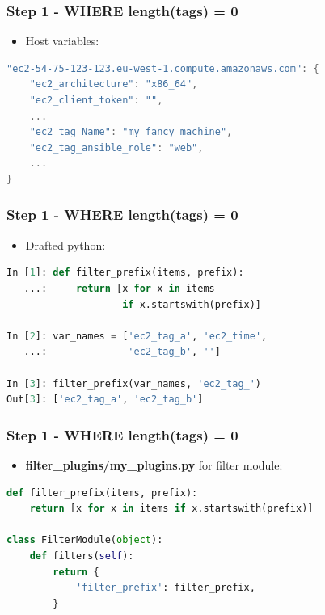 \documentclass{beamer}
\begin{document}
\begin{frame}[fragile]\frametitle{Step 1 - WHERE length(tags) = 0}

    \begin{itemize}
        \item Host variables:
    \end{itemize}

    \begin{lstlisting}[language=C]
"ec2-54-75-123-123.eu-west-1.compute.amazonaws.com": {
    "ec2_architecture": "x86_64",
    "ec2_client_token": "",
    ...
    "ec2_tag_Name": "my_fancy_machine",
    "ec2_tag_ansible_role": "web",
    ...
}
    \end{lstlisting}

\end{frame}


\begin{frame}[fragile]\frametitle{Step 1 - WHERE length(tags) = 0}

    \begin{itemize}
        \item Drafted python:
    \end{itemize}

    \begin{lstlisting}[language=Python]
In [1]: def filter_prefix(items, prefix):
   ...:     return [x for x in items
                    if x.startswith(prefix)]

In [2]: var_names = ['ec2_tag_a', 'ec2_time',
   ...:              'ec2_tag_b', '']

In [3]: filter_prefix(var_names, 'ec2_tag_')
Out[3]: ['ec2_tag_a', 'ec2_tag_b']
    \end{lstlisting}

\end{frame}


\begin{frame}[fragile]\frametitle{Step 1 - WHERE length(tags) = 0}

    \begin{itemize}
        \item \textbf{filter\_plugins/my\_plugins.py} for filter module:
    \end{itemize}

    \begin{lstlisting}[language=Python]
def filter_prefix(items, prefix):
    return [x for x in items if x.startswith(prefix)]

class FilterModule(object):
    def filters(self):
        return {
            'filter_prefix': filter_prefix,
        }
    \end{lstlisting}

\end{frame}
\end{document}

